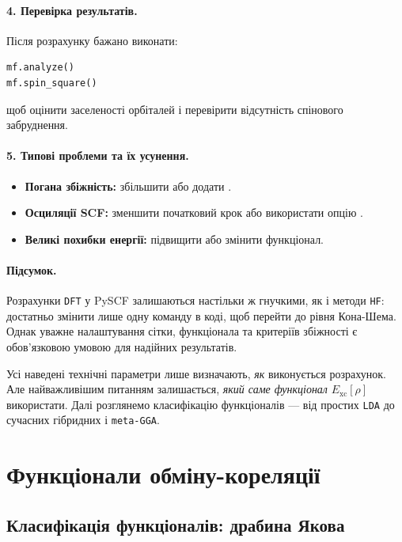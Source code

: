 \paragraph{4. Перевірка результатів.}
Після розрахунку бажано виконати:
\begin{verbatim}
mf.analyze()
mf.spin_square()
\end{verbatim}
щоб оцінити заселеності орбіталей і перевірити відсутність спінового забруднення.

\paragraph{5. Типові проблеми та їх усунення.}
\begin{itemize}
  \item \textbf{Погана збіжність:} збільшити  або додати .
  \item \textbf{Осциляції SCF:} зменшити початковий крок або використати опцію .
  \item \textbf{Великі похибки енергії:} підвищити  або змінити функціонал.
\end{itemize}

\paragraph{Підсумок.}
Розрахунки \texttt{DFT} у PySCF залишаються настільки ж гнучкими, як і методи \texttt{HF}:
достатньо змінити лише одну команду в коді, щоб перейти до рівня Кона-Шема.
Однак уважне налаштування сітки, функціонала та критеріїв збіжності є обов’язковою умовою для надійних результатів.

Усі наведені технічні параметри лише визначають, \textit{як} виконується розрахунок.
Але найважливішим питанням залишається, \textit{який саме функціонал} $E_{\text{xc}}[\rho]$ використати.
Далі розглянемо класифікацію функціоналів --- від простих \texttt{LDA} до сучасних гібридних і \texttt{meta-GGA}.

\section{Функціонали обміну-кореляції}

\subsection{Класифікація функціоналів: драбина Якова}

